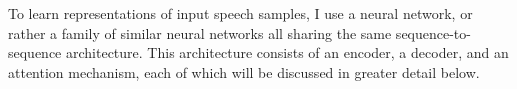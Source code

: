 To learn representations of input speech samples, I use a neural network, 
or rather a family of similar neural networks all sharing the same 
sequence-to-sequence architecture. This architecture consists of an 
encoder, a decoder, and an attention mechanism, each of which will be discussed 
in greater detail below.

